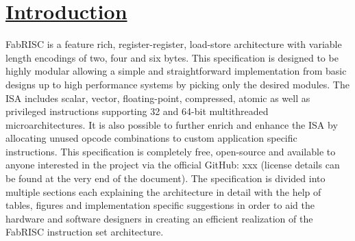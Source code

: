 \section[Introduction]{\LARGE\underline{Introduction}}

    \vspace{10pt}

    FabRISC is a feature rich, register-register, load-store architecture with variable length encodings of two, four and six bytes. This specification is designed to be highly modular allowing a simple and straightforward implementation from basic designs up to high performance systems by picking only the desired modules. The ISA includes scalar, vector, floating-point, compressed, atomic as well as privileged instructions supporting 32 and 64-bit multithreaded microarchitectures. It is also possible to further enrich and enhance the ISA by allocating unused opcode combinations to custom application specific instructions. This specification is completely free, open-source and available to anyone interested in the project via the official GitHub: xxx (license details can be found at the very end of the document). The specification is divided into multiple sections each explaining the architecture in detail with the help of tables, figures and implementation specific suggestions in order to aid the hardware and software designers in creating an efficient realization of the FabRISC instruction set architecture.

